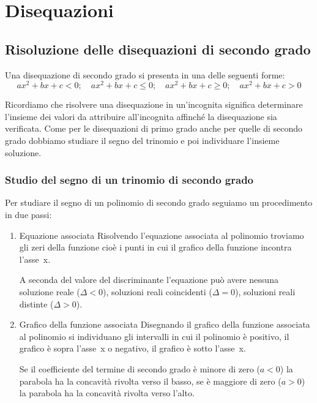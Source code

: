 


\chapter{Disequazioni}

\section{Risoluzione delle disequazioni di secondo grado}
\label{sec:diseq_secondo_grado}

Una disequazione di secondo grado si presenta in una delle seguenti forme:
\[ax^2+bx+c<0;\quad ax^2+bx+c\le 0;\quad ax^2+bx+c\ge0;\quad ax^2+bx+c> 0\]

Ricordiamo che risolvere una disequazione in un'incognita significa 
determinare l'insieme dei valori da attribuire all'incognita affinché la 
disequazione sia verificata.
Come per le disequazioni di primo grado anche per quelle di secondo grado
dobbiamo studiare il segno del trinomio e poi individuare l'insieme soluzione.

\subsection{Studio del segno di un trinomio di secondo grado}
\label{subsec:diseq_trinomio}

Per studiare il segno di un polinomio di secondo grado seguiamo un 
procedimento in due passi:

\begin{enumerate}
 \item Equazione associata
Risolvendo l'equazione associata al polinomio troviamo gli zeri della 
funzione cioè i punti in cui il grafico della funzione incontra l'asse~x. 

A seconda del valore del discriminante l'equazione può avere 
nessuna soluzione reale (\(\Delta<0\)), 
soluzioni reali coincidenti (\(\Delta=0\)), 
soluzioni reali distinte (\(\Delta>0\)).

 \item Grafico della funzione associata
Disegnando il grafico della funzione associata al polinomio si individuano 
gli intervalli in cui il polinomio è positivo, il grafico è sopra l'asse~x 
o negativo, il grafico è sotto l'asse~x.

Se il coefficiente del termine di secondo grado è minore di zero (\(a<0\)) 
la parabola ha la concavità rivolta verso il basso, se è maggiore di zero 
(\(a>0\)) la parabola ha la concavità rivolta verso l'alto. 
\end{enumerate}

